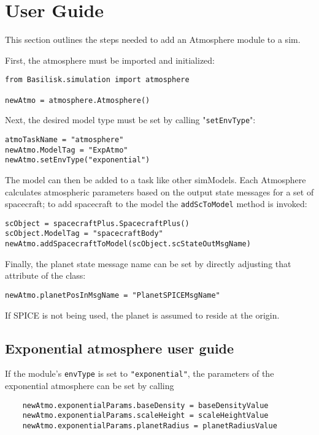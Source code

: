 
\section{User Guide}
This section outlines the steps needed to add an Atmosphere module to a sim.

First, the atmosphere must be imported and initialized:
\begin{verbatim}
from Basilisk.simulation import atmosphere

newAtmo = atmosphere.Atmosphere()
\end{verbatim}

Next, the desired model type must be set by calling "\verb|setEnvType|":
\begin{verbatim}
atmoTaskName = "atmosphere"
newAtmo.ModelTag = "ExpAtmo"
newAtmo.setEnvType("exponential")
\end{verbatim}

The model can then be added to a task like other simModels. Each Atmosphere calculates atmospheric parameters based on the output state messages for a set of spacecraft; to add spacecraft to the model the \verb|addScToModel| method is invoked:

\begin{verbatim}
scObject = spacecraftPlus.SpacecraftPlus()
scObject.ModelTag = "spacecraftBody"
newAtmo.addSpacecraftToModel(scObject.scStateOutMsgName)
\end{verbatim}

Finally, the planet state message name can be set by directly adjusting that attribute of the class:
\begin{verbatim}
newAtmo.planetPosInMsgName = "PlanetSPICEMsgName"
\end{verbatim}
If SPICE is not being used, the planet is assumed to reside at the origin.

\subsection{Exponential atmosphere user guide}
If the module's \verb|envType| is set to \verb|"exponential"|, the parameters of the exponential atmosphere can be set by calling
\begin{verbatim}
    newAtmo.exponentialParams.baseDensity = baseDensityValue
    newAtmo.exponentialParams.scaleHeight = scaleHeightValue
    newAtmo.exponentialParams.planetRadius = planetRadiusValue
\end{verbatim}